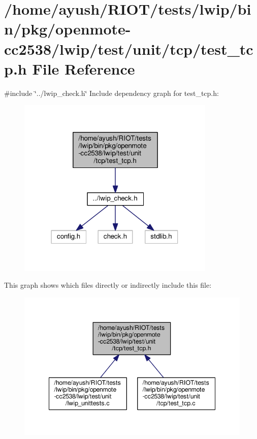 \hypertarget{openmote-cc2538_2lwip_2test_2unit_2tcp_2test__tcp_8h}{}\section{/home/ayush/\+R\+I\+O\+T/tests/lwip/bin/pkg/openmote-\/cc2538/lwip/test/unit/tcp/test\+\_\+tcp.h File Reference}
\label{openmote-cc2538_2lwip_2test_2unit_2tcp_2test__tcp_8h}
{\ttfamily \#include \char`\"{}../lwip\+\_\+check.\+h\char`\"{}}\newline
Include dependency graph for test\+\_\+tcp.\+h\+:
\nopagebreak
\begin{figure}[H]
\begin{center}
\leavevmode
\includegraphics[width=267pt]{openmote-cc2538_2lwip_2test_2unit_2tcp_2test__tcp_8h__incl}
\end{center}
\end{figure}
This graph shows which files directly or indirectly include this file\+:
\nopagebreak
\begin{figure}[H]
\begin{center}
\leavevmode
\includegraphics[width=348pt]{openmote-cc2538_2lwip_2test_2unit_2tcp_2test__tcp_8h__dep__incl}
\end{center}
\end{figure}
